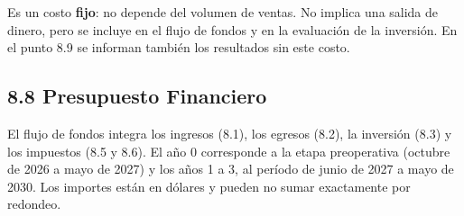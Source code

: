 Es un costo \textbf{fijo}: no depende del volumen de ventas. No implica
una salida de dinero, pero se incluye en el flujo de fondos y en la
evaluación de la inversión. En el punto 8.9 se informan también los
resultados sin este costo.

\subsection*{8.8 Presupuesto Financiero}\label{presupuesto-financiero}

El flujo de fondos integra los ingresos (8.1), los egresos (8.2), la
inversión (8.3) y los impuestos (8.5 y 8.6). El año 0 corresponde a la
etapa preoperativa (octubre de 2026 a mayo de 2027) y los años 1 a 3, al
período de junio de 2027 a mayo de 2030. Los importes están en dólares y
pueden no sumar exactamente por redondeo.

